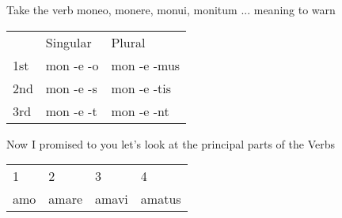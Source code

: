 Take the verb moneo, monere, monui, monitum ... meaning to warn
\begin{center}
  \begin{tabular}{lll}
    & Singular & Plural \\ 
    1st & mon -e -o  & mon -e -mus \\ 
    2nd & mon -e -s & mon -e -tis \\ 
    3rd & mon -e -t & mon -e -nt \\ 
  \end{tabular}
\end{center}
Now I promised to you let's look at the principal parts of the Verbs
\begin{center}
  \begin{tabular}{llll}
    1 & 2 & 3 & 4 \\ 
    amo & amare & amavi & amatus \\ 
  \end{tabular}
\end{center}

